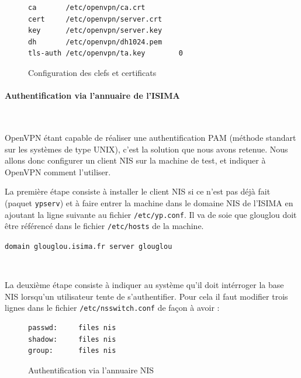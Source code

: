 \begin{figure}[H]
	\begin{center}
		\begin{minipage}{0.90\textwidth}
			\begin{lstlisting}[frame=trBL]
ca       /etc/openvpn/ca.crt
cert     /etc/openvpn/server.crt
key      /etc/openvpn/server.key
dh       /etc/openvpn/dh1024.pem
tls-auth /etc/openvpn/ta.key        0
			\end{lstlisting}
		\end{minipage}
	\end{center}
	\caption{Configuration des clefs et certificats}
	\label{configuration-clefs-et-certificats-serveur}
\end{figure}


\paragraph{Authentification via l'annuaire de l'ISIMA}
~

OpenVPN étant capable de réaliser une authentification PAM (méthode standart sur les systèmes de type UNIX), c'est la solution que nous avons retenue. Nous allons donc configurer un client NIS sur la machine de test, et indiquer à OpenVPN comment l'utiliser.

La première étape consiste à installer le client NIS si ce n'est pas déjà fait (paquet \texttt{ypserv}) et à faire entrer la machine dans le domaine NIS de l'ISIMA en ajoutant la ligne suivante au fichier \verb|/etc/yp.conf|. Il va de soie que glouglou doit être référencé dans le fichier \verb|/etc/hosts| de la machine.

\verb|domain glouglou.isima.fr server glouglou|

~

La deuxième étape consiste à indiquer au système qu'il doit intérroger la base NIS lorsqu'un utilisateur tente de s'authentifier. Pour cela il faut modifier trois lignes dans le fichier \verb|/etc/nsswitch.conf| de façon à avoir :

\begin{figure}[H]
	\begin{center}
		\begin{minipage}{0.90\textwidth}
			\begin{lstlisting}[frame=trBL]
passwd:     files nis
shadow:     files nis
group:      files nis
			\end{lstlisting}
		\end{minipage}
	\end{center}
	\caption{Authentification via l'annuaire NIS}
	\label{nsswitch_conf}
\end{figure}

